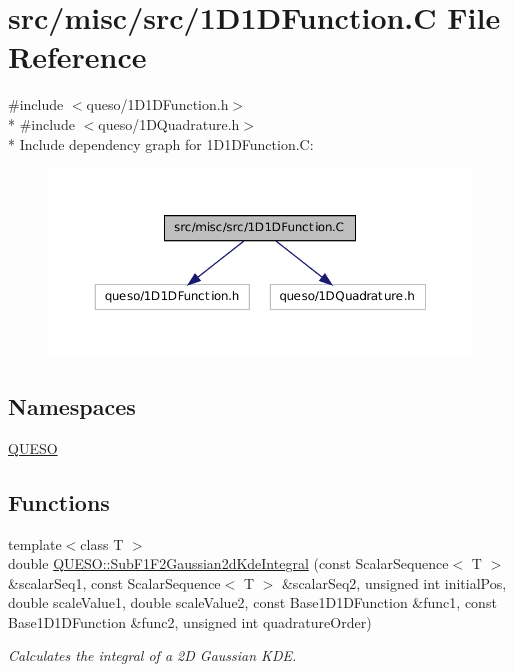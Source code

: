 \hypertarget{1_d1_d_function_8_c}{\section{src/misc/src/1\-D1\-D\-Function.C File Reference}
\label{1_d1_d_function_8_c}
}
{\ttfamily \#include $<$queso/1\-D1\-D\-Function.\-h$>$}\\*
{\ttfamily \#include $<$queso/1\-D\-Quadrature.\-h$>$}\\*
Include dependency graph for 1\-D1\-D\-Function.C\-:
\nopagebreak
\begin{figure}[H]
\begin{center}
\leavevmode
\includegraphics[width=350pt]{1_d1_d_function_8_c__incl}
\end{center}
\end{figure}
\subsection*{Namespaces}
\begin{DoxyCompactItemize}
\item 
\hyperlink{namespace_q_u_e_s_o}{Q\-U\-E\-S\-O}
\end{DoxyCompactItemize}
\subsection*{Functions}
\begin{DoxyCompactItemize}
\item 
{\footnotesize template$<$class T $>$ }\\double \hyperlink{namespace_q_u_e_s_o_a8c82b1fac926f75ad3e18cbd2d6a1b9d}{Q\-U\-E\-S\-O\-::\-Sub\-F1\-F2\-Gaussian2d\-Kde\-Integral} (const Scalar\-Sequence$<$ T $>$ \&scalar\-Seq1, const Scalar\-Sequence$<$ T $>$ \&scalar\-Seq2, unsigned int initial\-Pos, double scale\-Value1, double scale\-Value2, const Base1\-D1\-D\-Function \&func1, const Base1\-D1\-D\-Function \&func2, unsigned int quadrature\-Order)
\begin{DoxyCompactList}\small\item\em Calculates the integral of a 2\-D Gaussian K\-D\-E. \end{DoxyCompactList}\end{DoxyCompactItemize}
